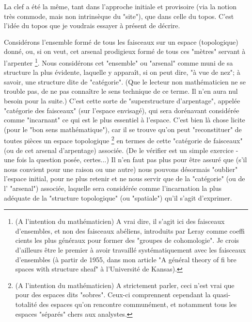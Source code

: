 La clef a été la même, tant dans l'approche initiale et provisoire (via la notion très commode, mais non intrinsèque du "site"), que dans celle du topos. C'est l'idée du topos que je voudrais essayer à présent de décrire.

Considérons l'ensemble formé de tous les faisceaux sur un espace (topologique) donné, ou, si on veut, cet arsenal prodigieux formé de tous ces "mètres" servant à l'arpenter \footnote{(A l'intention du mathématicien) A vrai dire, il s'agit ici des faisceaux d'ensembles, et non des faisceaux abéliens, introduits par Leray comme coeffi cients les plus généraux pour former des "groupes de cohomologie". Je crois d'ailleurs être le premier à avoir travaillé systématiquement avec les faisceaux d'ensembles (à partir de 1955, dans mon article "A général theory of fi bre spaces with structure sheaf" à l'Université de Kansas).}. Nous considérons cet "ensemble" ou "arsenal" comme muni de sa structure la plus évidente, laquelle y apparaît, si on peut dire, "à vue de nez"; à savoir, une structure dite de "catégorie". (Que le lecteur non mathématicien ne se trouble pas, de ne pas connaître le sens technique de ce terme. Il n'en aura nul besoin pour la suite.) C'est cette sorte de "superstructure d'arpentage", appelée "catégorie des faisceaux" (sur l'espace envisagé), qui sera dorénavant considérée comme "incarnant" ce qui est le plus essentiel à l'espace. C'est bien là chose licite (pour le "bon sens mathématique"), car il se trouve qu'on peut "reconstituer" de toutes pièces un espace topologique \footnote{(A l'intention du mathématicien) A strictement parler, ceci n'est vrai que pour des espaces dits "sobres". Ceux-ci comprennent cependant la quasi-totalité des espaces qu'on rencontre communément, et notamment tous les espaces "séparés" chers aux analystes.} en termes de cette "catégorie de faisceaux" (ou de cet arsenal d'arpentage) associée. (De le vérifier est un simple exercice - une fois la question posée, certes...) Il n'en faut pas plus pour être assuré que (s'il nous convient pour une raison ou une autre) nous pouvons désormais "oublier" l'espace initial, pour ne plus retenir et ne nous servir que de la "catégorie" (ou de l' "arsenal") associée, laquelle sera considérée comme l'incarnation la plus adéquate de la "structure topologique" (ou "spatiale") qu'il s'agit d'exprimer.

